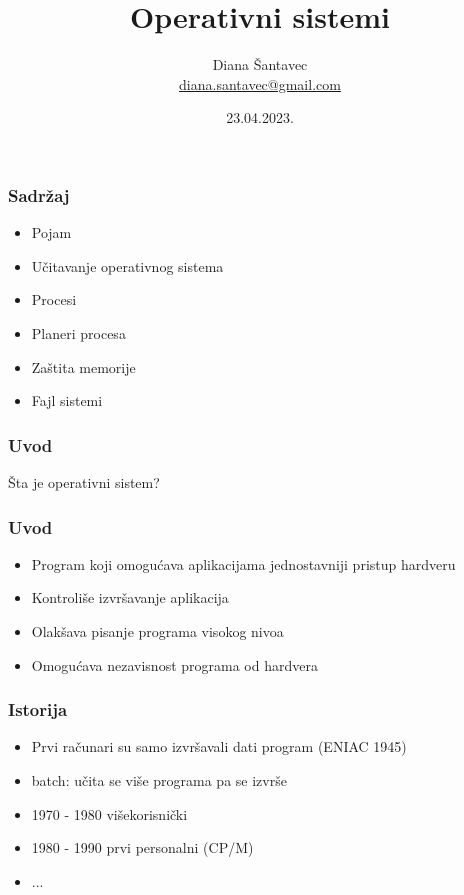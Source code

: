 \documentclass{beamer}
\title{Operativni sistemi}
\author[Diana Šantavec]{Diana Šantavec \\ \small \url{diana.santavec@gmail.com}}
\institute{Istraživačka stanica Petnica}
\date{23.04.2023.}
\begin{document}
\frame{\titlepage}


\begin{frame}
\frametitle{Sadržaj}
\begin{itemize}
    \item Pojam
    \item Učitavanje operativnog sistema
    \item Procesi
    \item Planeri procesa
    \item Zaštita memorije
    \item Fajl sistemi
\end{itemize}
\end{frame}

\begin{frame}
    \frametitle{Uvod}
    \begin{center}
        \large{Šta je operativni sistem?}
    \end{center}
\end{frame}


\begin{frame}
    \frametitle{Uvod}
    \begin{itemize}
        \item Program koji omogućava aplikacijama jednostavniji pristup hardveru \newline
        \item Kontroliše izvršavanje aplikacija \newline
        \item Olakšava pisanje programa visokog nivoa \newline
        \item Omogućava nezavisnost programa od hardvera \newline
    \end{itemize}
\end{frame}

\begin{frame}
    \frametitle{Istorija}
    \begin{itemize}
        \item Prvi računari su samo izvršavali dati program (ENIAC 1945)
        \item batch: učita se više programa pa se izvrše
        \item 1970 - 1980 višekorisnički
        \item 1980 - 1990 prvi personalni (CP/M)
        \item ...
    \end{itemize}
\end{frame}
\end{document}
